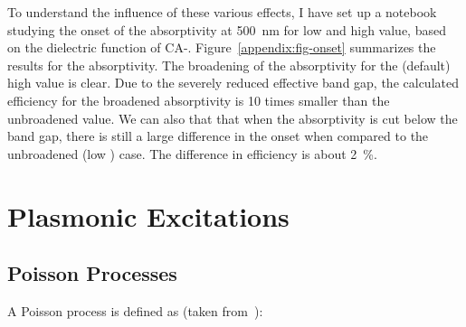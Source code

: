 \begin{refsection}
To understand the influence of these various effects, I have set up a 
notebook studying the onset of the absorptivity at 500~\si{\nano\meter}
for low and high  value, based on the dielectric function of 
CA-. Figure~\ref{appendix:fig-onset} summarizes the results for 
the absorptivity. The broadening of the absorptivity for the (default) high 
 value is clear. Due to the severely reduced effective band 
gap, the calculated efficiency for the broadened absorptivity is 10 times 
smaller than the unbroadened value. We can also that that when the absorptivity 
is cut below the band gap, there is still a large difference in the onset 
when compared to the unbroadened (low ) case. The difference in 
efficiency is about 2~\%.

\chapter{Plasmonic Excitations} \label{appendix:sec-plasmons} 

\section{Poisson Processes} \label{sec:appendix-poisson} 

A Poisson process is defined as (taken from~\cite{MITopencourseware}):


\end{refsection}
